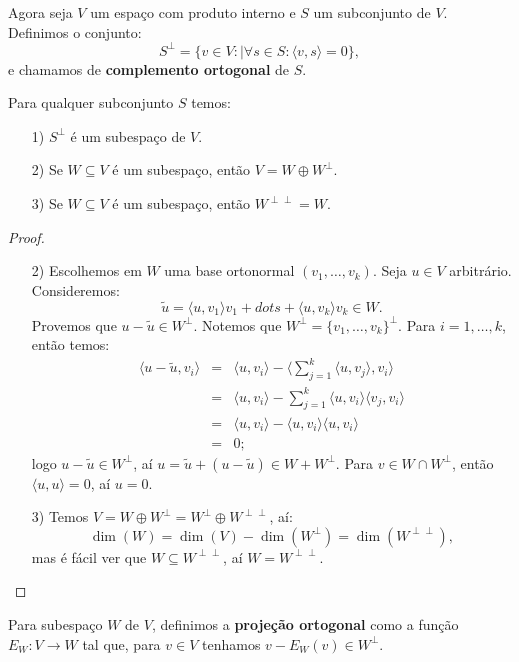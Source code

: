 \documentclass[11pt,twoside,a4paper]{book}
\begin{document}
\begin{definicao}
Agora seja $V$ um espaço com produto interno e $S$ um subconjunto de $V$. Definimos o conjunto:
\[
S^\perp=\{v\in V:\mid \forall s\in S:\langle v,s\rangle=0\},
\]
e chamamos de \textbf{complemento ortogonal} de $S$.
\end{definicao}

\begin{proposicao}
Para qualquer subconjunto $S$ temos:
\begin{itemize}
\item[1)] $S^\perp$ é um subespaço de $V$.
\item[2)] Se $W\subseteq V$ é um subespaço, então $V=W\oplus W^\perp$.
\item[3)] Se $W\subseteq V$ é um subespaço, então $W^{\perp\perp}=W$.
\end{itemize}
\end{proposicao}
\begin{proof}
\begin{itemize}
\item[2)] Escolhemos em $W$ uma base ortonormal $(v_1,\dots,v_k)$. Seja $u\in V$ arbitrário. Consideremos:
\[
\tilde{u}=\langle u,v_1\rangle v_1+dots+\langle u,v_k\rangle v_k\in W.
\]
Provemos que $u-\tilde{u}\in W^\perp$. Notemos que $W^\perp=\{v_1,\dots,v_k\}^\perp$. Para $i=1,\dots,k$, então temos:
\[
\begin{array}{rcl}
\langle u-\tilde{u},v_i\rangle&=&\langle u,v_i\rangle-\langle\sum_{j=1}^k\langle u,v_j\rangle,v_i\rangle\\
&=&\langle u,v_i\rangle-\sum_{j=1}^k\langle u,v_i\rangle\langle v_j,v_i\rangle\\
&=&\langle u,v_i\rangle-\langle u,v_i\rangle\langle u,v_i\rangle\\
&=&0;
\end{array}
\]
logo $u-\tilde{u}\in W^\perp$, aí $u=\tilde{u}+(u-\tilde{u})\in W+W^\perp$. Para $v\in W\cap W^\perp$, então $\langle u,u\rangle=0$, aí $u=0$.
\item[3)] Temos $V=W\oplus W^\perp=W^\perp\oplus W^{\perp\perp}$, aí:
\[
\dim(W)=\dim(V)-\dim(W^\perp)=\dim(W^{\perp\perp}),
\]
mas é fácil ver que $W\subseteq W^{\perp\perp}$, aí $W=W^{\perp\perp}$.
\end{itemize}
\end{proof}

\begin{definicao}
Para subespaço $W$ de $V$, definimos a \textbf{projeção ortogonal} como a função $E_W:V\rightarrow W$ tal que, para $v\in V$ tenhamos $v-E_W(v)\in W^\perp$.
\end{definicao}
\end{document}
